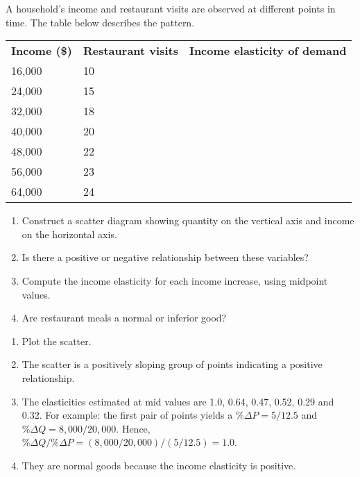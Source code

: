 \begin{enumialphparenastyle}
\begin{ex}\label{ex:ch4ex9}
A household's income and restaurant visits are observed at different points in time. The table below describes the pattern.
\begin{center}
\begin{tabu} to \linewidth {|X[1,c]X[1,c]X[1,c]|}	\hline
{}	\textbf{Income (\$)}	&	\textbf{Restaurant visits}	&	\textbf{Income elasticity of demand}	\\
						16,000	&	10	&		\\
	24,000	&	15	&		\\
						32,000	&	18	&		\\
	40,000	&	20	&		\\
						48,000	&	22	&		\\
	56,000	&	23	&		\\
						64,000	&	24	&		\\	\hline
\end{tabu}
\end{center}
\begin{enumerate}
	\item	Construct a scatter diagram showing quantity on the vertical axis and income on the horizontal axis.
	\item	Is there a positive or negative relationship between these variables?
	\item	Compute the income elasticity for each income increase, using midpoint values.
	\item	Are restaurant meals a normal or inferior good?
\end{enumerate}
\begin{sol}
\begin{enumerate}
	\item	Plot the scatter.
	\item	The scatter is a positively sloping group of points indicating a positive relationship.
	\item	The elasticities estimated at mid values are 1.0, 0.64, 0.47, 0.52, 0.29 and 0.32. For example: the first pair of points yields a $\%\Delta P=5/12.5$ and $\%\Delta Q=8,000/20,000$. Hence, $\%\Delta Q/\%\Delta P=(8,000/20,000)/(5/12.5)=1.0$.
	\item	They are normal goods because the income elasticity is positive.
\end{enumerate}
\end{sol}
\end{ex}


\end{enumialphparenastyle}
